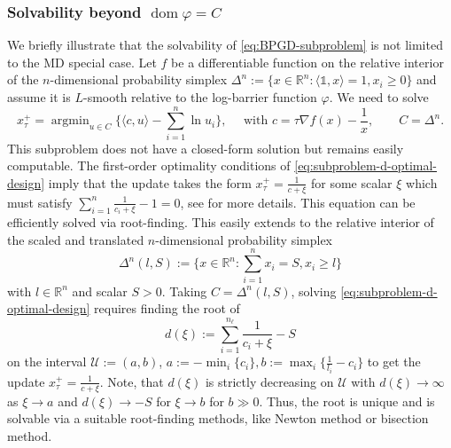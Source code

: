 \documentclass[11pt,reqno]{amsart}
\numberwithin{equation}{section}
\numberwithin{figure}{section}
\theoremstyle{plain}
\theoremstyle{definition}
\newcommand{\mc}[1]{\mathcal{#1}}
\newcommand{\R}{\mathbb{R}}
\newcommand{\la}{\langle}
\newcommand{\ra}{\rangle}
\newcommand{\vphi}{\varphi}
\newcommand{\df}{\nabla f}
\newcommand{\eins}{\mathbb{1}}
\DeclareMathOperator{\dom}{dom}
\DeclareMathOperator*{\argmin}{arg min}
\begin{document}
\subsubsection{Solvability beyond $\dom \vphi = C$} \label{subsec:solvability_simplex}
We briefly illustrate that the solvability of \eqref{eq:BPGD-subproblem} is not limited to the MD special case. Let $f$ be a differentiable function on the relative interior of the $n$-dimensional probability simplex $\Delta^n := \{x \in \R^n: \la \eins, x \ra = 1, x_i \geq 0 \}$ and assume it is $L$-smooth relative to the 
log-barrier function $\vphi$. We need to solve
    \begin{equation} \label{eq:subproblem-d-optimal-design}
        x^{+}_\tau = \argmin_{u \in C} \{\la c, u \ra - \sum_{i = 1}^n \ln u_i \}, \quad \text{ with }c = \tau \df(x) - \frac{1}{x}, \qquad C = \Delta^n.
    \end{equation}
    This subproblem does not have a closed-form solution but remains easily computable. The first-order optimality conditions of \eqref{eq:subproblem-d-optimal-design} imply that the update takes the form $x_\tau^+ = \frac{1}{c + \xi}$ for some scalar $\xi$ which must satisfy $\sum_{i = 1}^n \frac{1}{c_i + \xi} - 1 = 0$, see \cite{Lu2018} for more details. This equation can be efficiently solved via root-finding. 
    This easily extends to the relative interior of the scaled and translated $n$-dimensional probability simplex
    \begin{equation}
    \Delta^{n}(l,S) := \{ x \in \R^{n}: \sum_{i = 1}^{n} x_i = S, x_i \geq l \}
    \end{equation}
    with $l \in \R^n$ and scalar $S > 0$. Taking $C = \Delta^n(l,S)$, solving \eqref{eq:subproblem-d-optimal-design} requires finding the root of
    \begin{equation}
    d(\xi) := \sum_{i = 1}^{n_\ell} \frac{1}{c_i + \xi} - S
    \end{equation}
    on the interval $\mc{U}:=(a,b)$, $a := -\min_i \{c_i\}, b := \max_i \{\frac{1}{l_i} - c_i\}$ to get the update $x_\tau^+ = \frac{1}{c + \xi}$. Note, that $d(\xi)$ is strictly decreasing on $\mc{U}$ with $d(\xi) \to \infty$ as $\xi \to a$ and $d(\xi) \to -S$ for $\xi \to b$ for $b \gg 0$. Thus, the root is unique and is solvable via a suitable root-finding methods, like Newton method or bisection method. 


\FloatBarrier


\end{document}
